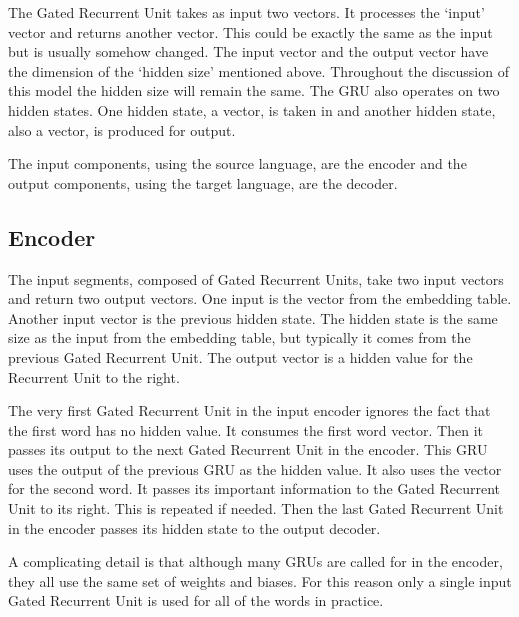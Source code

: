 The Gated Recurrent Unit takes as input two vectors. It processes the `input' vector and returns another vector. This could be exactly the same as the input but is usually somehow changed. The input vector and the output vector have the dimension of the `hidden size' mentioned above. Throughout the discussion of this model the hidden size will remain the same. The GRU also operates on two hidden states. One hidden state, a vector, is taken in and another hidden state, also a vector, is produced for output.

The input components, using the source language, are the encoder and the output components, using the target language, are the decoder.



\subsection{Encoder}

The input segments, composed of Gated Recurrent Units, take two input vectors and return two output vectors. One input is the vector from the embedding table. Another input vector is the previous hidden state. The hidden state is the same size as the input from the embedding table, but typically it comes from the previous Gated Recurrent Unit. The output vector is a hidden value for the Recurrent Unit to the right. %

The very first Gated Recurrent Unit in the input encoder ignores the fact that the first word has no hidden value. It consumes the first word vector. Then it passes its output to the next Gated Recurrent Unit in the encoder. This GRU uses the output of the previous GRU as the hidden value. It also uses the vector for the second word. It passes its important information to the Gated Recurrent Unit to its right. This is repeated if needed. Then the last Gated Recurrent Unit in the encoder passes its hidden state to the output decoder.

A complicating detail is that although many GRUs are called for in the encoder, they all use the same set of weights and biases. For this reason only a single input Gated Recurrent Unit is used for all of the words in practice. 


